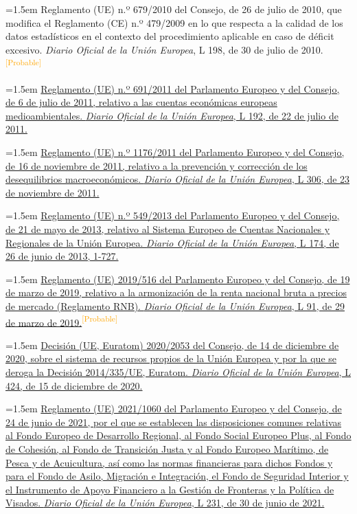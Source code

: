 \documentclass[10pt,a4paper]{article}
\begin{document}
\noindent\hangindent=1.5em Reglamento (UE) n.º 679/2010 del Consejo, de 26 de julio de 2010, que modifica el Reglamento (CE) n.º 479/2009 en lo que respecta a la calidad de los datos estadísticos en el contexto del procedimiento aplicable en caso de déficit excesivo. \textit{Diario Oficial de la Unión Europea}, L 198, de 30 de julio de 2010.\textcolor{orange}{\textsuperscript{[Probable]}}

\noindent\hangindent=1.5em \href{https://eur-lex.europa.eu/eli/reg/2011/691/oj}{Reglamento (UE) n.º 691/2011 del Parlamento Europeo y del Consejo, de 6 de julio de 2011, relativo a las cuentas económicas europeas medioambientales. \textit{Diario Oficial de la Unión Europea}, L 192, de 22 de julio de 2011.}

\noindent\hangindent=1.5em \href{https://eur-lex.europa.eu/eli/reg/2011/1176/oj}{Reglamento (UE) n.º 1176/2011 del Parlamento Europeo y del Consejo, de 16 de noviembre de 2011, relativo a la prevención y corrección de los desequilibrios macroeconómicos. \textit{Diario Oficial de la Unión Europea}, L 306, de 23 de noviembre de 2011.}

\noindent\hangindent=1.5em \href{https://eur-lex.europa.eu/eli/reg/2013/549/oj}{Reglamento (UE) n.º 549/2013 del Parlamento Europeo y del Consejo, de 21 de mayo de 2013, relativo al Sistema Europeo de Cuentas Nacionales y Regionales de la Unión Europea. \textit{Diario Oficial de la Unión Europea}, L 174, de 26 de junio de 2013, 1-727.}

\noindent\hangindent=1.5em \href{https://eur-lex.europa.eu/eli/reg/2019/516/oj}{Reglamento (UE) 2019/516 del Parlamento Europeo y del Consejo, de 19 de marzo de 2019, relativo a la armonización de la renta nacional bruta a precios de mercado (Reglamento RNB). \textit{Diario Oficial de la Unión Europea}, L 91, de 29 de marzo de 2019.}\textcolor{orange}{\textsuperscript{[Probable]}}

\noindent\hangindent=1.5em \href{https://eur-lex.europa.eu/eli/dec/2020/2053/oj}{Decisión (UE, Euratom) 2020/2053 del Consejo, de 14 de diciembre de 2020, sobre el sistema de recursos propios de la Unión Europea y por la que se deroga la Decisión 2014/335/UE, Euratom. \textit{Diario Oficial de la Unión Europea}, L 424, de 15 de diciembre de 2020.}

\noindent\hangindent=1.5em \href{https://eur-lex.europa.eu/eli/reg/2021/1060/oj}{Reglamento (UE) 2021/1060 del Parlamento Europeo y del Consejo, de 24 de junio de 2021, por el que se establecen las disposiciones comunes relativas al Fondo Europeo de Desarrollo Regional, al Fondo Social Europeo Plus, al Fondo de Cohesión, al Fondo de Transición Justa y al Fondo Europeo Marítimo, de Pesca y de Acuicultura, así como las normas financieras para dichos Fondos y para el Fondo de Asilo, Migración e Integración, el Fondo de Seguridad Interior y el Instrumento de Apoyo Financiero a la Gestión de Fronteras y la Política de Visados. \textit{Diario Oficial de la Unión Europea}, L 231, de 30 de junio de 2021.}
\end{document}
